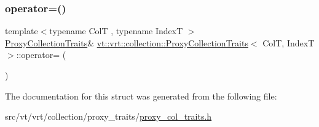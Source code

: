 \subsubsection{\texorpdfstring{operator=()}{operator=()}}
{\footnotesize\ttfamily template$<$typename ColT , typename IndexT $>$ \\
\hyperlink{structvt_1_1vrt_1_1collection_1_1_proxy_collection_traits}{Proxy\+Collection\+Traits}\& \hyperlink{structvt_1_1vrt_1_1collection_1_1_proxy_collection_traits}{vt\+::vrt\+::collection\+::\+Proxy\+Collection\+Traits}$<$ ColT, IndexT $>$\+::operator= (\begin{DoxyParamCaption}\item[{\hyperlink{structvt_1_1vrt_1_1collection_1_1_proxy_collection_traits}{Proxy\+Collection\+Traits}$<$ ColT, IndexT $>$ const \&}]{ }\end{DoxyParamCaption})\hspace{0.3cm}{\ttfamily [default]}}



The documentation for this struct was generated from the following file\+:\begin{DoxyCompactItemize}
\item 
src/vt/vrt/collection/proxy\+\_\+traits/\hyperlink{proxy__col__traits_8h}{proxy\+\_\+col\+\_\+traits.\+h}\end{DoxyCompactItemize}
